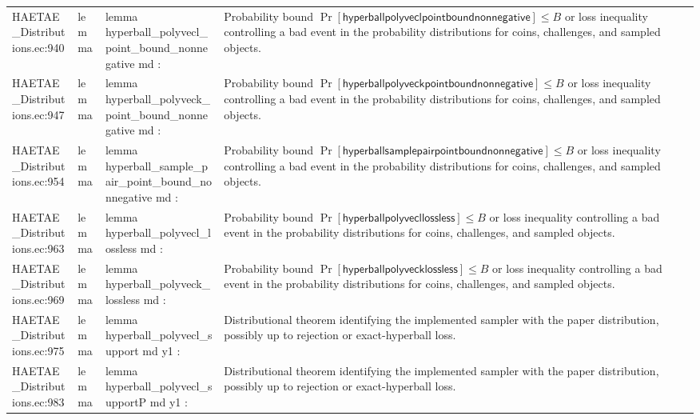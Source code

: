 \documentclass[10pt]{article}
\begin{document}
\begin{longtable}{L{0.11\textwidth}L{0.055\textwidth}L{0.385\textwidth}L{0.41\textwidth}}
HAETAE\_\allowbreak{}Distributions.\allowbreak{}ec:\allowbreak{}940 & lemma & {\ttfamily\scriptsize lemma hyperball\_\allowbreak{}polyvecl\_\allowbreak{}point\_\allowbreak{}bound\_\allowbreak{}nonnegative md :} & Probability bound $\Pr[\mathsf{hyperballpolyveclpointboundnonnegative}]\le B$ or loss inequality controlling a bad event in the probability distributions for coins, challenges, and sampled objects. \\
HAETAE\_\allowbreak{}Distributions.\allowbreak{}ec:\allowbreak{}947 & lemma & {\ttfamily\scriptsize lemma hyperball\_\allowbreak{}polyveck\_\allowbreak{}point\_\allowbreak{}bound\_\allowbreak{}nonnegative md :} & Probability bound $\Pr[\mathsf{hyperballpolyveckpointboundnonnegative}]\le B$ or loss inequality controlling a bad event in the probability distributions for coins, challenges, and sampled objects. \\
HAETAE\_\allowbreak{}Distributions.\allowbreak{}ec:\allowbreak{}954 & lemma & {\ttfamily\scriptsize lemma hyperball\_\allowbreak{}sample\_\allowbreak{}pair\_\allowbreak{}point\_\allowbreak{}bound\_\allowbreak{}nonnegative md :} & Probability bound $\Pr[\mathsf{hyperballsamplepairpointboundnonnegative}]\le B$ or loss inequality controlling a bad event in the probability distributions for coins, challenges, and sampled objects. \\
HAETAE\_\allowbreak{}Distributions.\allowbreak{}ec:\allowbreak{}963 & lemma & {\ttfamily\scriptsize lemma hyperball\_\allowbreak{}polyvecl\_\allowbreak{}lossless md :} & Probability bound $\Pr[\mathsf{hyperballpolyvecllossless}]\le B$ or loss inequality controlling a bad event in the probability distributions for coins, challenges, and sampled objects. \\
HAETAE\_\allowbreak{}Distributions.\allowbreak{}ec:\allowbreak{}969 & lemma & {\ttfamily\scriptsize lemma hyperball\_\allowbreak{}polyveck\_\allowbreak{}lossless md :} & Probability bound $\Pr[\mathsf{hyperballpolyvecklossless}]\le B$ or loss inequality controlling a bad event in the probability distributions for coins, challenges, and sampled objects. \\
HAETAE\_\allowbreak{}Distributions.\allowbreak{}ec:\allowbreak{}975 & lemma & {\ttfamily\scriptsize lemma hyperball\_\allowbreak{}polyvecl\_\allowbreak{}support md y1 :} & Distributional theorem identifying the implemented sampler with the paper distribution, possibly up to rejection or exact-hyperball loss. \\
HAETAE\_\allowbreak{}Distributions.\allowbreak{}ec:\allowbreak{}983 & lemma & {\ttfamily\scriptsize lemma hyperball\_\allowbreak{}polyvecl\_\allowbreak{}supportP md y1 :} & Distributional theorem identifying the implemented sampler with the paper distribution, possibly up to rejection or exact-hyperball loss. \\

\end{longtable}
\end{document}
